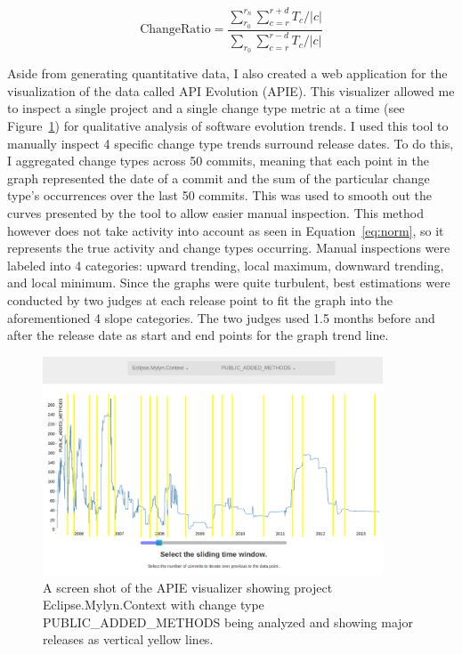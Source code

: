 \begin{equation}
\text{ChangeRatio} = \frac{ \sum_{r_0}^{r_n}\sum_{c=r}^{r+d} T_c / |c|} { \sum_{r_0}\sum_{c=r}^{r-d} T_c / |c|}
\label{eq:norm}
\end{equation}

Aside from generating quantitative data, I also created a web application for the visualization of the data called API Evolution (APIE). This visualizer allowed
me to inspect a single project and a single change type metric at a time (see Figure~\ref{fig:apie}) for qualitative analysis of software evolution trends. I
used this tool to manually inspect 4 specific change type trends surround release dates. To do this, I aggregated change types across 50 commits, meaning that
each point in the graph represented the date of a commit and the sum of the particular change type's occurrences over the last 50 commits. This was used to smooth
out the curves presented by the tool to allow easier manual inspection. This method however does not take activity into account as seen in
Equation~\ref{eq:norm}, so it represents the true activity and change types occurring. Manual inspections were labeled into 4 categories: upward trending, local maximum, downward
trending, and local minimum. Since the graphs were quite turbulent, best estimations were conducted by two judges at each release point to fit the graph into the aforementioned
4 slope categories. The two judges used 1.5 months before and after the release date as start and end points for the graph trend line.

\begin{figure}[tb!]
\centering
\includegraphics[width=0.9\textwidth]{figures/APIE.png}
\caption{A screen shot of the APIE visualizer showing project Eclipse.Mylyn.Context with change type PUBLIC\_ADDED\_METHODS being analyzed and showing
major releases as vertical yellow lines.\label{fig:apie}}
\end{figure}

